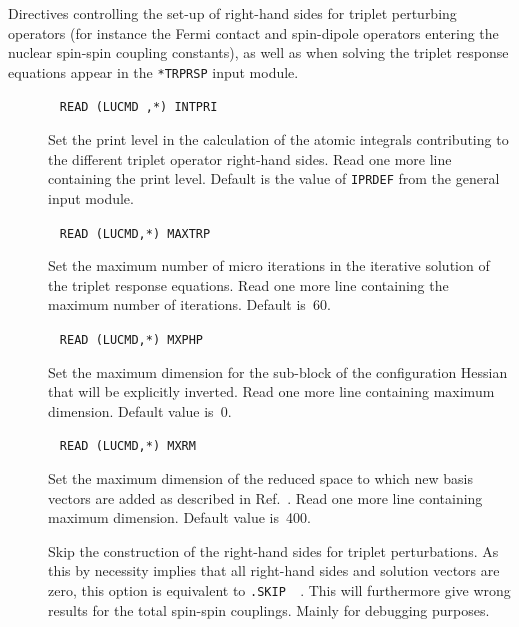 Directives controlling the set-up of right-hand sides for triplet
perturbing operators (for instance the Fermi contact and spin-dipole
operators entering the nuclear spin-spin coupling
constants),
as well as when solving the triplet response equations appear in the
\verb|*TRPRSP| input module. 

\begin{description}
\item[]\verb| |\newline
\verb|READ (LUCMD ,*) INTPRI|

Set the print level in the calculation of the atomic integrals
contributing to the different triplet operator right-hand sides. Read
one more line containing the print level. Default is the value
of \verb|IPRDEF| from the general input module.

\item[]\verb| |\newline
\verb|READ (LUCMD,*) MAXTRP|

Set the maximum number of micro iterations in the iterative solution of
the triplet response equations. Read one more line containing the
maximum number of iterations. Default is~60.

\item[]\verb| |\newline
\verb|READ (LUCMD,*) MXPHP|

Set the maximum dimension for the sub-block of the configuration
Hessian that will be explicitly inverted. Read one more line
containing maximum dimension. Default value is~0.

\item[]\verb| |\newline
\verb|READ (LUCMD,*) MXRM|

Set the maximum dimension of the reduced space to which new basis
vectors are added as described in Ref.~\cite{tuhjahjajpjjcp84}. Read
one more line containing maximum dimension. Default value is~400.

\item[] Skip the construction of the right-hand sides
for triplet perturbations. As this by necessity implies that all
right-hand sides and solution vectors are zero, this option is
equivalent to \verb|.SKIP  |. This will furthermore give wrong results
for the total spin-spin couplings. Mainly for debugging purposes.


\end{description}
